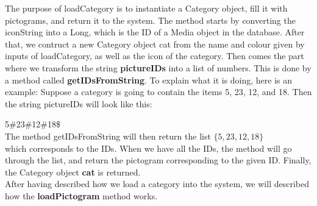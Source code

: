 The purpose of loadCategory is to instantiate a Category object, fill it with pictograms, and return it to the system.
The method starts by converting the iconString into a Long, which is the ID of a Media object in the database.
After that, we contruct a new Category object cat from the name and colour given by inputs of loadCategory, as well as the icon of the category.
Then comes the part where we transform the string \textbf{pictureIDs} into a list of numbers.
This is done by a method called \textbf{getIDsFromString}.
To explain what it is doing, here is an example:
Suppose a category is going to contain the items 5, 23, 12, and 18. Then the string pictureIDs will look like this:\newline

5\#23\#12\#18\$\\

The method getIDsFromString will then return the list\newline
\begin{math}
	\{5,23,12,18\}
\end{math}
\\
which corresponds to the IDs.
When we have all the IDs, the method will go through the list, and return the pictogram corresponding to the given ID.
Finally, the Category object \textbf{cat} is returned.\newline
\\
After having described how we load a category into the system, we will described how the \textbf{loadPictogram} method works.

